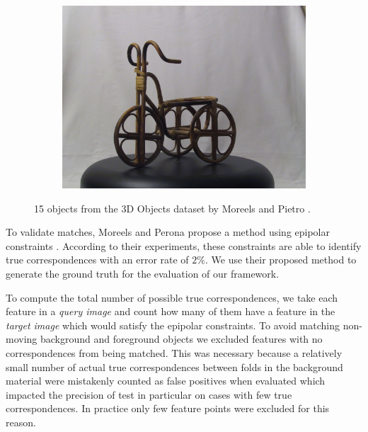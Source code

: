 \documentclass[10pt,twocolumn,letterpaper]{article}
\begin{document}
\begin{figure}[htb]
\begin{subfigure}[t]{0.15\columnwidth}
        \includegraphics[width=1\columnwidth]{images/3d/15}
    \end{subfigure}%
    \vspace{1.5 mm}

    \caption{15 objects from the 3D Objects dataset by Moreels
    and Pietro \cite{moreels2007evaluation}.}
    \label{fig:3d_objects}
\end{figure}

To validate matches, Moreels and Perona propose a method using epipolar constraints \cite[p.266]{moreels2007evaluation}.  According to their experiments, these constraints are able to identify true correspondences with an error rate of $2\%$. We use their proposed method to generate the ground truth for the evaluation of our framework.

To compute the total number of possible true correspondences, we take each feature in a \emph{query image} and count how many of them have a feature in the \emph{target image} which would satisfy the epipolar constraints. To avoid matching non-moving background and foreground objects we excluded features with no correspondences from being matched. This was necessary because a relatively small number of actual true correspondences between folds in the background material were mistakenly counted as false positives when evaluated which impacted the precision of test in particular on cases with few true correspondences. In practice only few feature points were excluded for this reason.
\end{document}
